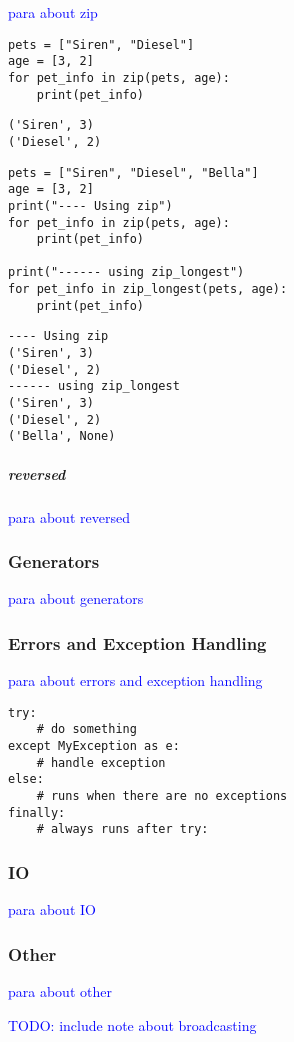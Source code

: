 \textcolor{blue}{para about zip}

\begin{lstlisting}[style=pyInStyle]
pets = ["Siren", "Diesel"]
age = [3, 2]
for pet_info in zip(pets, age):
    print(pet_info)
\end{lstlisting}
\begin{lstlisting}[style=pyOutStyle]
('Siren', 3)
('Diesel', 2)
\end{lstlisting}

\begin{lstlisting}[style=pyInStyle]
pets = ["Siren", "Diesel", "Bella"]
age = [3, 2]
print("---- Using zip")
for pet_info in zip(pets, age):
    print(pet_info)

print("------ using zip_longest")
for pet_info in zip_longest(pets, age):
    print(pet_info)
\end{lstlisting}
\begin{lstlisting}[style=pyOutStyle]
---- Using zip
('Siren', 3)
('Diesel', 2)
------ using zip_longest
('Siren', 3)
('Diesel', 2)
('Bella', None)
\end{lstlisting}

\subparagraph{reversed}

\textcolor{blue}{para about reversed}

\subsubsection{Generators}

\textcolor{blue}{para about generators}

\subsubsection{Errors and Exception Handling}

\textcolor{blue}{para about errors and exception handling}

\begin{lstlisting}[style=pyInStyle]
try:
    # do something
except MyException as e:
    # handle exception
else:
    # runs when there are no exceptions
finally:
    # always runs after try:
\end{lstlisting}

\subsubsection{IO}

\textcolor{blue}{para about IO}

\subsubsection{Other}

\textcolor{blue}{para about other}

\textcolor{blue}{TODO: include note about broadcasting}


